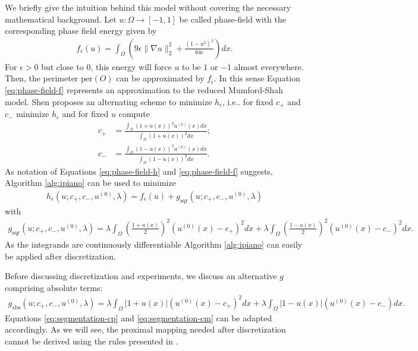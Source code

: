 \documentclass[onecolumn,final,a4paper,13pt,reqno]{siamart}
\makeatletter
\DeclareRobustCommand\onedot{\futurelet\@let@token\@onedot}
\def\@onedot{\ifx\@let@token.\else.\null\fi\xspace}
\def\ie{{i.e}\onedot} \def\Ie{{I.e}\onedot}
\def\per{\text{per}}
\makeatother
\begin{document}
We briefly give the intuition behind this model without covering the necessary mathematical background. Let $u : \Omega \rightarrow [-1, 1]$ be called phase-field with the corresponding phase field energy given by
\begin{align}
	f_\epsilon(u) = \int_\Omega \left(9\epsilon \|\nabla u\|_2^2 + \frac{(1 - u^2)^2}{64 \epsilon}\right) dx.\label{eq:phase-field-f}
\end{align}
For $\epsilon > 0$ but close to $0$, this energy will force $u$ to be $1$ or $-1$ almost everywhere. Then, the perimeter $\per(O)$ can be approximated by $f_\epsilon$. In this sense Equation \eqref{eq:phase-field-f} represents an approximation to the reduced Mumford-Shah model. Shen proposes an alternating scheme to minimize $h_\epsilon$, \ie for fixed $c_+$ and $c_-$ minimize $h_\epsilon$ and for fixed $u$ compute
\begin{align}
	c_+ &= \frac{\int_\Omega (1 + u(x))^2 u^{(0)}(x) dx}{\int_\Omega (1 + u(x))^2 dx};\label{eq:segmentation-cp}\\
	c_- &= \frac{\int_\Omega (1 - u(x))^2 u^{(0)}(x) dx}{\int_\Omega (1 - u(x))^2 dx}.\label{eq:segmentation-cm}
\end{align}
As notation of Equations \eqref{eq:phase-field-h} and \eqref{eq:phase-field-f} suggests, Algorithm \ref{alg:ipiano} can be used to minimize
\begin{align}
	h_\epsilon(u; c_+, c_-, u^{(0)}, \lambda) = f_\epsilon(u) + g_{\text{sqr}}(u; c_+, c_-, u^{(0)}, \lambda)
\end{align}
with
\begin{align}
	g_{\text{sqr}}(u; c_+, c_-, u^{(0)}, \lambda) = \lambda \int_{\Omega}\left(\frac{1 + u(x)}{2}\right)^2(u^{(0)}(x) - c_+)^2 dx + \lambda \int_{\Omega} \left(\frac{1 - u(x)}{2}\right)^2 (u^{(0)}(x) - c_-)^2 dx.
\end{align}
As the integrands are continuously differentiable Algorithm \ref{alg:ipiano} can easily be applied after discretization. 

Before discussing discretization and experiments, we discuss an alternative $g$ comprising absolute terms:
\begin{align}
	g_{\text{abs}}(u; c_+, c_-, u^{(0)}, \lambda) = \lambda \int_{\Omega}|1 + u(x)|(u^{(0)}(x) - c_+)^2 dx + \lambda \int_{\Omega} |1 - u(x)| (u^{(0)}(x) - c_-)dx.
\end{align}
Equations \eqref{eq:segmentation-cp} and \eqref{eq:segmentation-cm} can be adapted accordingly. As we will see, the proximal mapping needed after discretization cannot be derived using the rules presented in \cite{CombettesPesquet:2011}.
\end{document}
